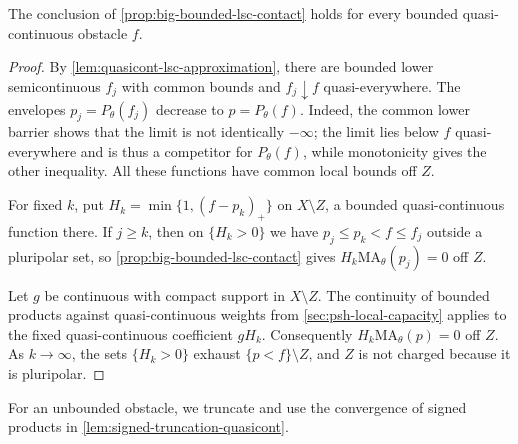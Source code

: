 \begin{proposition}\label{prop:big-bounded-quasicont-contact}
The conclusion of \cref{prop:big-bounded-lsc-contact} holds for every bounded quasi-continuous obstacle $f$.
\end{proposition}
\begin{proof}
By \cref{lem:quasicont-lsc-approximation}, there are bounded lower semicontinuous $f_j$ with common bounds and $f_j\downarrow f$ quasi-everywhere. The envelopes $p_j=P_\theta(f_j)$ decrease to $p=P_\theta(f)$. Indeed, the common lower barrier shows that the limit is not identically $-\infty$; the limit lies below $f$ quasi-everywhere and is thus a competitor for $P_\theta(f)$, while monotonicity gives the other inequality. All these functions have common local bounds off $Z$.

For fixed $k$, put $H_k=\min\{1,(f-p_k)_+\}$ on $X\setminus Z$, a bounded quasi-continuous function there. If $j\geq k$, then on $\{H_k>0\}$ we have $p_j\leq p_k<f\leq f_j$ outside a pluripolar set, so \cref{prop:big-bounded-lsc-contact} gives $H_k\mathrm{MA}_\theta(p_j)=0$ off $Z$.

Let $g$ be continuous with compact support in $X\setminus Z$. The continuity of bounded products against quasi-continuous weights from \cref{sec:psh-local-capacity} applies to the fixed quasi-continuous coefficient $gH_k$. Consequently $H_k\mathrm{MA}_\theta(p)=0$ off $Z$. As $k\to\infty$, the sets $\{H_k>0\}$ exhaust $\{p<f\}\setminus Z$, and $Z$ is not charged because it is pluripolar.
\end{proof}

For an unbounded obstacle, we truncate and use the convergence of signed products in \cref{lem:signed-truncation-quasicont}.

